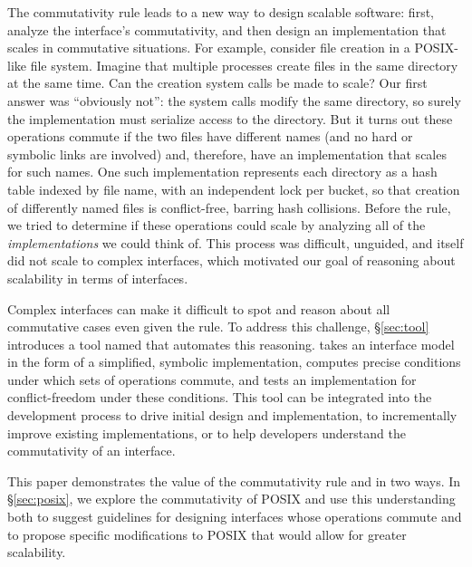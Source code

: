 The commutativity rule leads to a new way to design scalable
software:
%
first, analyze the interface's commutativity, and then design an
implementation that
scales in commutative situations.
%
For example,
consider file creation in a POSIX-like file system. Imagine that
multiple processes create files in the same directory at the same
time. Can the creation system calls be made to scale? Our
first answer was ``obviously not'': the system calls modify the same
directory, so surely the implementation must
serialize access to the directory. But it turns
out these operations commute if the two files have different names
(and no hard or symbolic links are involved) and, therefore, have an
implementation that scales for such names.
One such implementation represents each directory as a hash table
indexed by file name, with an independent lock per bucket,
so that creation of differently named files is conflict-free, barring
hash collisions.
%
Before the rule, we tried to determine if these
operations could scale by analyzing all of the \emph{implementations}
we could think
of.  This process was difficult, unguided, and itself did not scale to
complex interfaces, which
motivated our goal of reasoning about
scalability in terms of interfaces.

Complex interfaces can make it difficult to spot and reason about all
commutative cases even given the rule.  To address this challenge,
\S\ref{sec:tool} introduces a tool named \tool that automates this
reasoning.  \tool takes an interface model
in the form of a simplified, symbolic implementation, computes precise
conditions under which sets of operations commute, and tests an
implementation for conflict-freedom under these conditions.  This tool can be
integrated into the development process to drive initial design and
implementation, to incrementally improve existing implementations, or to
help developers understand the commutativity of an interface.

This paper demonstrates the value of the commutativity rule and \tool
in two ways.
In \S\ref{sec:posix}, we explore the commutativity of POSIX
and use this
understanding both to suggest 
guidelines for designing interfaces
whose operations commute and
to propose specific modifications to POSIX
that would allow for greater scalability.

